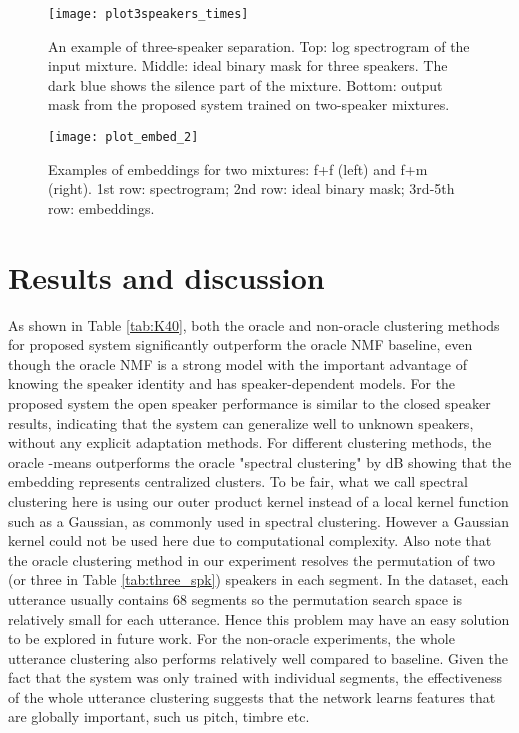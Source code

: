 \documentclass[9pt]{article} \usepackage{nips15submit_e,times}
\begin{document}
\begin{figure}[ht]
	\centering
    \vspace{-.5cm}
	\texttt{[image: plot3speakers\_times]}
		\vspace{-.3cm}
	\caption{An example of three-speaker separation. Top: log spectrogram of the input mixture. Middle: ideal binary mask for three speakers. The dark blue shows the silence part of the mixture.  Bottom: output mask from the proposed system trained on two-speaker mixtures.}
	\label{fig:3speakers}	\vspace{-.3cm}
\end{figure} 

\begin{figure}[ht]
	\centering
	\texttt{[image: plot\_embed\_2]}
	\vspace{-.3cm}
	\caption{Examples of embeddings for two mixtures:  f+f (left) and f+m (right). 1st row: spectrogram; 2nd row: ideal binary mask; 3rd-5th row: embeddings.}
	\label{fig:embed}	\vspace{-.5cm}
\end{figure} 




\section{Results and discussion}



As shown in Table \ref{tab:K40}, both the oracle and non-oracle clustering methods for proposed system significantly outperform the oracle NMF baseline, even though the oracle NMF is a strong model with the important advantage of knowing the speaker identity and has speaker-dependent models. For the proposed system the open speaker performance is similar to the closed speaker results, indicating that the system can generalize well to unknown speakers, without any explicit adaptation methods. 
For different clustering methods, the oracle -means outperforms the oracle "spectral clustering" by  dB showing that the embedding represents centralized clusters.   To be fair, what we call spectral clustering here is using our outer product kernel instead of a local kernel function such as a Gaussian, as commonly used in spectral clustering.  However a Gaussian kernel could not be used here due to computational complexity.     
Also note that the oracle clustering method in our experiment resolves the permutation of two (or three in Table \ref{tab:three_spk}) speakers in each segment. In the dataset, each utterance usually contains 68 segments so the permutation search space is relatively small for each utterance.  Hence this problem may have an easy solution to be explored in future work. For the non-oracle experiments, the whole utterance clustering also performs relatively well compared  to baseline.  Given the fact that the system was only trained with individual segments, the effectiveness of the whole utterance clustering suggests that the network learns features that are globally important, such us pitch, timbre etc. 
\end{document}
